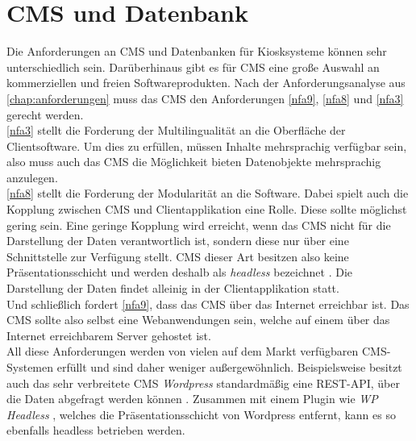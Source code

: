 \section{CMS und Datenbank}
\label{sec:backend}

Die Anforderungen an CMS und Datenbanken für Kiosksysteme können sehr unterschiedlich sein. 
Darüberhinaus gibt es für CMS eine große Auswahl an kommerziellen und freien Softwareprodukten.
Nach der Anforderungsanalyse aus \autoref{chap:anforderungen} muss das CMS den Anforderungen
\ref{nfa9}, \ref{nfa8} und \ref{nfa3} gerecht werden.\\

\ref{nfa3} stellt die Forderung der Multilingualität an die Oberfläche der Clientsoftware. 
Um dies zu erfüllen, müssen Inhalte mehrsprachig verfügbar sein, also muss auch 
das CMS die Möglichkeit bieten Datenobjekte mehrsprachig anzulegen.\\

\ref{nfa8} stellt die Forderung der Modularität an die Software. 
Dabei spielt auch die Kopplung zwischen CMS und 
Clientapplikation eine Rolle. Diese sollte möglichst gering sein. Eine geringe Kopplung
wird erreicht, wenn das CMS nicht für die Darstellung der Daten verantwortlich ist, sondern 
diese nur über eine Schnittstelle zur Verfügung stellt. CMS dieser Art besitzen also 
keine Präsentationsschicht und werden deshalb als \emph{headless} bezeichnet \cite{headless-market}.
Die Darstellung der Daten findet alleinig in der Clientapplikation statt.\\

Und schließlich fordert \ref{nfa9}, dass das CMS über das Internet erreichbar ist. 
Das CMS sollte also selbst eine Webanwendungen sein, welche auf einem über das Internet erreichbarem Server
gehostet ist.\\

All diese Anforderungen werden von vielen auf dem Markt verfügbaren CMS-Systemen erfüllt
und sind daher weniger außergewöhnlich. Beispielsweise besitzt auch das sehr verbreitete CMS \emph{Wordpress} 
standardmäßig eine REST-API, über die Daten abgefragt werden können \cite{wordpress}. Zusammen mit einem 
Plugin wie \emph{WP Headless} \cite{wordpress-headless}, welches die Präsentationsschicht von Wordpress
entfernt, kann es so ebenfalls headless betrieben werden. \\

